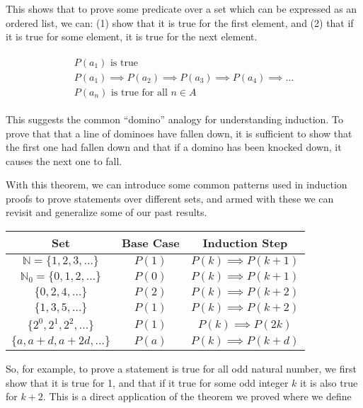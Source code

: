 \vspace{\baselineskip}

This shows that to prove some predicate over a set which can be expressed as an ordered list, we can: (1) show that it is true for the first element, and (2) that if it is true for some element, it is true for the next element.

\begin{align*}
	\begin{array}{l}
		P(a_1) \text{ is true} \\
		P(a_1) \implies P(a_2) \implies P(a_3) \implies P(a_4) \implies \dots \\
		\hline
		P(a_n) \text{ is true for all } n \in A
	\end{array}
\end{align*}

This suggests the common ``domino'' analogy for understanding induction. To prove that that a line of dominoes have fallen down, it is sufficient to show that the first one had fallen down and that if a domino has been knocked down, it causes the next one to fall.

With this theorem, we can introduce some common patterns used in induction proofs to prove statements over different sets, and armed with these we can revisit and generalize some of our past results.


\vspace{\baselineskip}
\begin{center}
	\begin{tabular}{ccc}
		\toprule
		Set & Base Case & Induction Step \\
		\midrule
		$\mathbb{N} = \{ 1, 2, 3, \dots \}$ & $P(1)$ & $P(k) \implies P(k + 1)$ \\
		$\mathbb{N}_0 = \{ 0, 1, 2, \dots \}$ & $P(0)$ & $P(k) \implies P(k + 1)$ \\
		$\{ 0, 2, 4, \dots \}$ & $P(2)$ & $P(k) \implies P(k + 2)$ \\
		$\{ 1, 3, 5, \dots \}$ & $P(1)$ & $P(k) \implies P(k + 2)$ \\
		$\{ 2^0, 2^1, 2^2, \dots \}$ & $P(1)$ & $P(k) \implies P(2k)$ \\
		$\{ a, a + d, a + 2d, \dots \}$ & $P(a)$ & $P(k) \implies P(k + d)$ \\
		\bottomrule
	\end{tabular}
\end{center}
\vspace{\baselineskip}

So, for example, to prove a statement is true for all odd natural number, we first show that it is true for 1, and that if it true for some odd integer $k$ it is also true for $k + 2$. This is a direct application of the theorem we proved where we define

